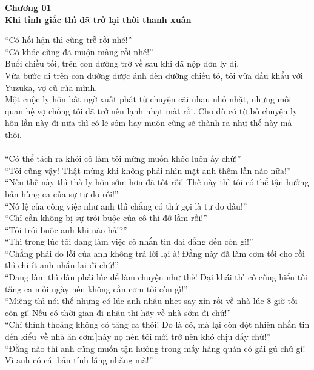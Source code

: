 \documentclass[12pt,a4paper, twosides]{book}
\begin{document}
    

    \begin{center}
    \textbf{\large Chương 01 \\ Khi tỉnh giấc thì đã trở lại thời thanh xuân}
    \end{center}
    \noindent
“Có hối hận thì cũng trễ rồi nhé!”\\
“Có khóc cũng đã muộn màng rồi nhé!”\\
Buổi chiều tối, trên con đường trở về sau khi đã nộp đơn ly dị.\\
Vừa bước đi trên con đường được ánh đèn đường chiếu tỏ, tôi vừa đấu khẩu với Yuzuka, vợ cũ của mình.\\
Một cuộc ly hôn bất ngờ xuất phát từ chuyện cãi nhau nhỏ nhặt, nhưng mối quan hệ vợ chồng tôi đã trở nên lạnh nhạt mất rồi. Cho dù có từ bỏ chuyện ly hôn lần này đi nữa thì có lẽ sớm hay muộn cũng sẽ thành ra như thế này mà thôi.\\
\\
“Có thể tách ra khỏi cô làm tôi mừng muốn khóc luôn ấy chứ!”\\
“Tôi cũng vậy! Thật mừng khi không phải nhìn mặt anh thêm lần nào nữa!”\\
“Nếu thế này thì thà ly hôn sớm hơn đã tốt rồi! Thế này thì tôi có thể tận hưởng bản hùng ca của sự tự do rồi!”\\
“Nô lệ của công việc như anh thì chẳng có thứ gọi là tự do đâu!”\\
“Chỉ cần không bị sự trói buộc của cô thì đỡ lắm rồi!”\\
“Tôi trói buộc anh khi nào hả!?”\\
“Thì trong lúc tôi đang làm việc cô nhắn tin dai dẳng đến còn gì!”\\
“Chẳng phải do lỗi của anh không trả lời lại à! Đằng này đã làm cơm tối cho rồi thì chí ít anh nhắn lại đi chứ!”\\
“Đang làm thì đâu phải lúc để làm chuyện như thế! Đại khái thì cô cũng hiểu tôi tăng ca mỗi ngày nên không cần cơm tối còn gì!”\\
“Miệng thì nói thế nhưng có lúc anh nhậu nhẹt say xỉn rồi về nhà lúc 8 giờ tối còn gì! Nếu có thời gian đi nhậu thì hãy về nhà sớm đi chứ!”\\
“Chỉ thỉnh thoảng không có tăng ca thôi! Do là cô, mà lại còn đột nhiên nhắn tin đến kiểu$\lfloor$về nhà ăn cơm$\rceil$này nọ nên tôi mới trở nên khó chịu đấy chứ!”\\
“Đằng nào thì anh cũng muốn tận hưởng trong mấy hàng quán có gái gú chứ gì! Vì anh có cái bản tính lăng nhăng mà!”\\
\end{document}
